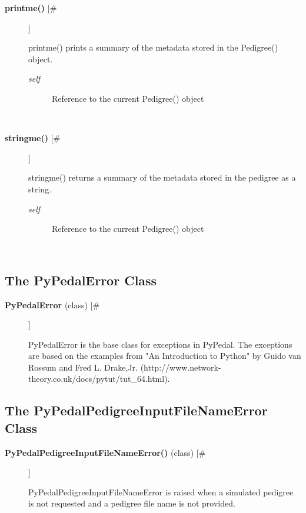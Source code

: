 \begin{description}
\item[\textbf{printme()} [\#]
]
\par printme() prints a summary of the metadata stored in the Pedigree() object.
\begin{description}
\item[\textit{self}
]
Reference to the current Pedigree() object
\end{description}\\

\item[\textbf{stringme()} [\#]
]
\par stringme() returns a summary of the metadata stored in the pedigree as
a string.
\begin{description}
\item[\textit{self}
]
Reference to the current Pedigree() object
\end{description}\\

\end{description}
\subsection*{The PyPedalError Class}
\begin{description}
\item[\textbf{PyPedalError} (class)  [\#]
]
\par PyPedalError is the base class for exceptions in PyPedal. The exceptions
are based on the examples from "An Introduction to Python" by Guido van
Rossum and Fred L. Drake,Jr.
(http://www.network-theory.co.uk/docs/pytut/tut\_64.html).

\end{description}
\subsection*{The PyPedalPedigreeInputFileNameError Class}
\begin{description}
\item[\textbf{PyPedalPedigreeInputFileNameError()} (class) [\#]
]
\par PyPedalPedigreeInputFileNameError is raised when a simulated pedigree
is not requested and a pedigree file name is not provided.

\end{description}
